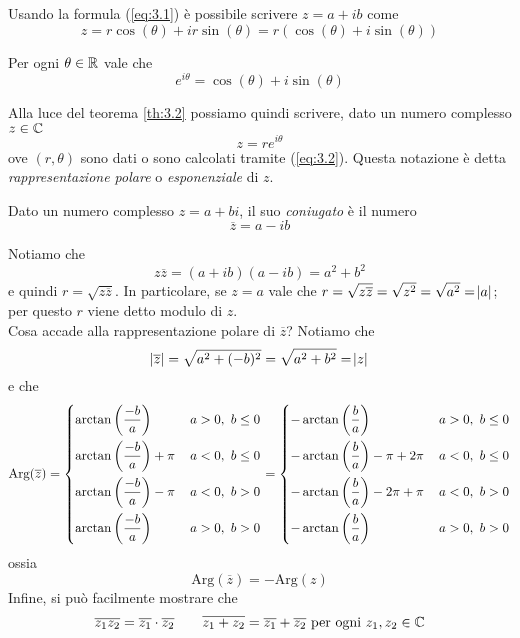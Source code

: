 Usando la formula (\ref{eq:3.1}) è possibile scrivere $z=a+ib$ come
\[
z=r\cos(\theta) + ir\sin(\theta) = r(\cos(\theta)+i\sin(\theta))
\]
\begin{theorem}
    \label{th:3.2}
    Per ogni $\theta\in\amsbb{R}$ vale che
    \[
    e^{i\theta} = \cos(\theta) + i\sin(\theta)
    \]
\end{theorem}
Alla luce del teorema \ref{th:3.2} possiamo quindi scrivere, dato un numero complesso $z\in\amsbb{C}$
\begin{equation}
    \label{eq:3.3}
    z=re^{i\theta}
\end{equation}
ove $(r,\theta)$ sono dati o sono calcolati tramite (\ref{eq:3.2}). Questa notazione è detta \emph{rappresentazione polare} o \emph{esponenziale} di $z$.
\begin{definition}
    \label{def:3.}
    Dato un numero complesso $z=a+bi$, il suo \emph{coniugato} è il numero
    \[
    \overline{z} = a-ib
    \]
\end{definition}
\begin{remark}
    Notiamo che
    \[
    z\overline{z} = (a+ib)(a-ib) = a^2+b^2
    \]
    e quindi $r=\sqrt{z\overline{z}}$. In particolare, se $z=a$ vale che $r = \sqrt{z\overline{z}} = \sqrt{z^2}=\sqrt{a^2}=\abs{a}$; per questo $r$ viene detto modulo di $z$.\\
    Cosa accade alla rappresentazione polare di $\overline{z}$? Notiamo che
    \[
    \abs{\overline{z}} = \sqrt{a^2+(-b)^2} = \sqrt{a^2+b^2} = \abs{z}
    \]
    e che
    \[
    \text{Arg}(\overline{z}) = \begin{dcases}
        \arctan\left(\frac{-b}{a}\right)\, & a>0, \ b\le 0\\
        \arctan\left(\frac{-b}{a}\right)+\pi\, & a<0, \ b\le 0\\
        \arctan\left(\frac{-b}{a}\right)-\pi\, & a<0, \ b> 0\\
        \arctan\left(\frac{-b}{a}\right)\, & a>0, \ b> 0
        \end{dcases} = \begin{dcases}
        -\arctan\left(\frac{b}{a}\right)\, & a>0, \ b\le 0\\
        -\arctan\left(\frac{b}{a}\right)-\pi+2\pi\, & a<0, \ b\le 0\\
        -\arctan\left(\frac{b}{a}\right)-2\pi+\pi\, & a<0, \ b> 0\\
        -\arctan\left(\frac{b}{a}\right)\, & a>0, \ b> 0
        \end{dcases}
    \]
    ossia
    \[
    \text{Arg}(\overline{z}) = -\text{Arg}(z)
    \]
    Infine, si può facilmente mostrare che
    \[
    \overline{z_1 z_2} = \overline{z_1} \cdot \overline{z_2}\qquad \overline{z_1 + z_2 } = \overline{z_1}+\overline{z_2} \ \text{per ogni} \ z_1, z_2\in\amsbb{C}
    \]
\end{remark}

